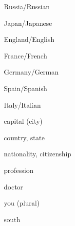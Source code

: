 \documentclass[avery5371,grid,frame]{flashcards}
\begin{document}
\begin{flashcard}{\LARGE Russia/Russian}
\LARGE {}
\end{flashcard}
\begin{flashcard}{\LARGE Japan/Japanese}
\LARGE {}
\end{flashcard}
\begin{flashcard}{\LARGE England/English}
\LARGE {}
\end{flashcard}
\begin{flashcard}{\LARGE France/French}
\LARGE {}
\end{flashcard}
\begin{flashcard}{\LARGE Germany/German}
\LARGE {}
\end{flashcard}
\begin{flashcard}{\LARGE Spain/Spanish}
\LARGE {}
\end{flashcard}
\begin{flashcard}{\LARGE Italy/Italian}
\LARGE {}
\end{flashcard}
\begin{flashcard}{\LARGE capital (city)}
\LARGE {}
\end{flashcard}
\begin{flashcard}{\LARGE country, state}
\LARGE {}
\end{flashcard}
\begin{flashcard}{\LARGE nationality, citizenship}
\LARGE {}
\end{flashcard}
\begin{flashcard}{\LARGE profession}
\LARGE {}
\end{flashcard}
\begin{flashcard}{\LARGE doctor}
\LARGE {}
\end{flashcard}
\begin{flashcard}{\LARGE you (plural)}
\LARGE {}
\end{flashcard}
\begin{flashcard}{\LARGE south}
\LARGE {}
\end{flashcard}
\end{document}
